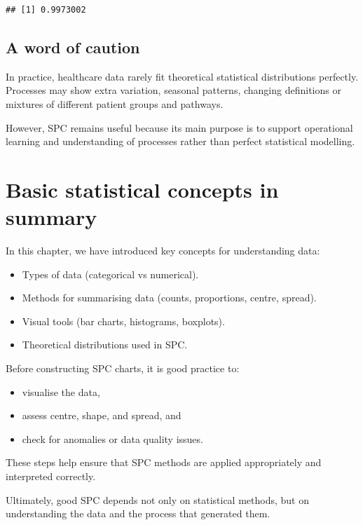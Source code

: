 \documentclass[
]{book}
\providecommand{\tightlist}{%
  \setlength{\itemsep}{0pt}\setlength{\parskip}{0pt}}
\begin{document}
\begin{verbatim}
## [1] 0.9973002
\end{verbatim}

\subsection{A word of caution}\label{a-word-of-caution}

In practice, healthcare data rarely fit theoretical statistical
distributions perfectly. Processes may show extra variation, seasonal
patterns, changing definitions or mixtures of different patient groups
and pathways.

However, SPC remains useful because its main purpose is to support
operational learning and understanding of processes rather than perfect
statistical modelling.

\section{Basic statistical concepts in
summary}\label{basic-statistical-concepts-in-summary}

In this chapter, we have introduced key concepts for understanding data:

\begin{itemize}
\tightlist
\item
  Types of data (categorical vs numerical).
\item
  Methods for summarising data (counts, proportions, centre, spread).
\item
  Visual tools (bar charts, histograms, boxplots).
\item
  Theoretical distributions used in SPC.
\end{itemize}

Before constructing SPC charts, it is good practice to:

\begin{itemize}
\tightlist
\item
  visualise the data,
\item
  assess centre, shape, and spread, and
\item
  check for anomalies or data quality issues.
\end{itemize}

These steps help ensure that SPC methods are applied appropriately and
interpreted correctly.

Ultimately, good SPC depends not only on statistical methods, but on
understanding the data and the process that generated them.
\end{document}
